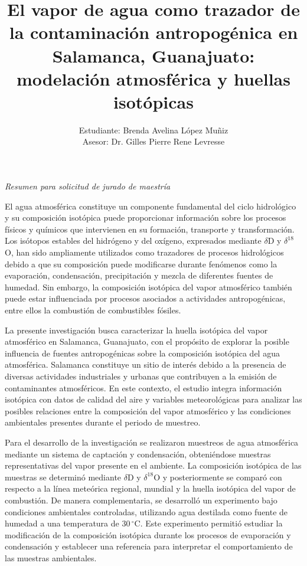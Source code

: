 \documentclass[12pt,a4paper]{article}
\title{\textbf{El vapor de agua como trazador de la contaminación antropogénica
         en Salamanca, Guanajuato: modelación atmosférica y huellas isotópicas}}
\author{%
  Estudiante: Brenda Avelina López Muñiz\\[0.5em]
  Asesor: Dr. Gilles Pierre Rene Levresse
}
\begin{document}
\maketitle

\begin{center}
\textit{Resumen para solicitud de jurado de maestría}
\end{center}

\vspace{0.5cm}

El agua atmosférica constituye un componente fundamental del ciclo 
hidrológico y su composición isotópica puede proporcionar información
sobre los procesos físicos y químicos que intervienen en su formación,
transporte y transformación. Los isótopos estables del hidrógeno y 
del oxígeno, expresados mediante $\delta$D y $\delta^{18}$O, han
sido ampliamente utilizados como trazadores de procesos hidrológicos
debido a que su composición puede modificarse durante fenómenos 
como la evaporación, condensación, precipitación y mezcla de 
diferentes fuentes de humedad. Sin embargo, la composición 
isotópica del vapor atmosférico también puede estar influenciada 
por procesos asociados a actividades antropogénicas, entre ellos 
la combustión de combustibles fósiles.

La presente investigación busca caracterizar la huella isotópica del 
vapor atmosférico en Salamanca, Guanajuato, con el propósito de explorar
la posible influencia de fuentes antropogénicas sobre la composición isotópica 
del agua atmosférica. Salamanca constituye un sitio de interés debido a la
presencia de diversas actividades industriales y urbanas que contribuyen a la 
emisión de contaminantes atmosféricos. En este contexto, el estudio integra
información isotópica con datos de calidad del aire y variables meteorológicas
para analizar las posibles relaciones entre la composición del vapor atmosférico
y las condiciones ambientales presentes durante el periodo de muestreo.

Para el desarrollo de la investigación se realizaron muestreos de agua atmosférica 
mediante un sistema de captación y condensación, obteniéndose muestras representativas
del vapor presente en el ambiente. La composición isotópica de las muestras se determinó 
mediante $\delta$D y $\delta^{18}$O y posteriormente se comparó con respecto a la 
línea meteórica regional, mundial y la huella isotópica del vapor de 
combustión. De manera complementaria, se desarrolló un 
experimento bajo condiciones ambientales controladas, utilizando agua destilada como 
fuente de humedad a una temperatura de $30\,^{\circ}\mathrm{C}$. Este experimento 
permitió estudiar la modificación de la 
composición isotópica durante los procesos de evaporación y condensación y 
establecer una referencia para interpretar el comportamiento de las muestras 
ambientales.
\end{document}
